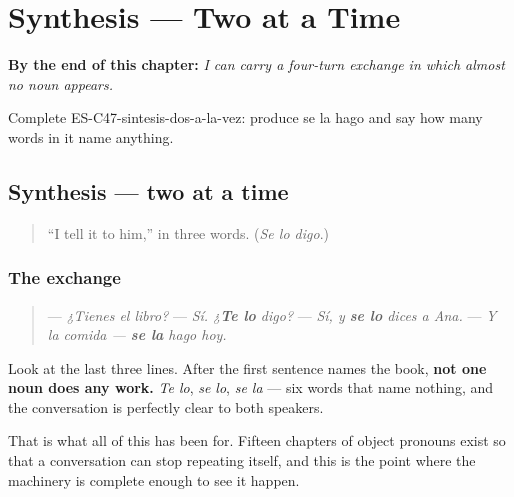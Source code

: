 
\chapter{Synthesis --- Two at a Time}
\label{ch:synthesis-double-object}

\begin{chapteropening}
\textbf{By the end of this chapter:} \emph{I can carry a four-turn exchange in which almost no noun appears.}

Complete ES-C47-sintesis-dos-a-la-vez: produce se la hago and say how many words in it name anything.
\end{chapteropening}

\section[Practice]{Synthesis — two at a time}

\label{lesson:ES-C47-sintesis-dos-a-la-vez}



\begin{quote}
\textquotedblleft{}I tell it to him,\textquotedblright{} in three words. (\emph{Se lo digo}.)
\end{quote}

\subsection*{The exchange}
\begin{quote}
— \emph{¿Tienes el libro?} — \emph{Sí. ¿\textbf{Te lo} digo?} — \emph{Sí, y \textbf{se lo} dices a Ana.} — \emph{Y la comida — \textbf{se la} hago hoy.}
\end{quote}

Look at the last three lines. After the first sentence names the book, \textbf{not one noun does any work.} \emph{Te lo}, \emph{se lo}, \emph{se la} — six words that name nothing, and the conversation is perfectly clear to both speakers.

That is what all of this has been for. Fifteen chapters of object pronouns exist so that a conversation can stop repeating itself, and this is the point where the machinery is complete enough to see it happen.

